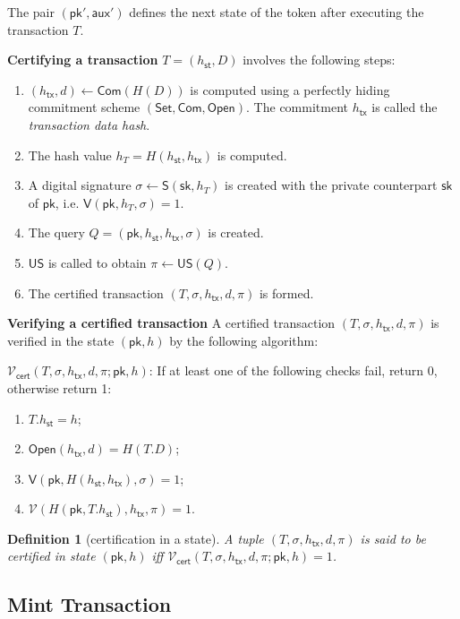 \documentclass{article}
\newtheorem{definition}{Definition}[section]
\newcommand{\sig}[0]{\mathsf{S}}
\newcommand{\sigver}[0]{\mathsf{V}}
\newcommand{\pubkey}[0]{\mathsf{pk}}
\newcommand{\prikey}[0]{\mathsf{sk}}
\newcommand{\setup}[0]{\mathsf{Set}}
\newcommand{\commit}[0]{\mathsf{Com}}
\newcommand{\open}[0]{\mathsf{Open}}
\newcommand{\unisrv}[0]{\mathsf{US}}
\newcommand{\sthash}[0]{h_\mathsf{st}}
\newcommand{\txhash}[0]{h_\mathsf{tx}}
\newcommand{\auxd}[0]{\mathsf{aux}}
\newcommand{\univer}[0]{\mathcal{V}}
\newcommand{\certver}[0]{\mathcal{V}_\mathsf{cert}}
\begin{document}
The pair $(\pubkey', \auxd')$ defines the next state of the token after executing the transaction $T$.

\noindent\textbf{Certifying a transaction} $T = (\sthash, D)$ involves the following steps:
\begin{enumerate}
\item $(\txhash,d) \gets \commit(H(D))$ is computed using a perfectly hiding commitment scheme $(\setup,\commit,\open)$.
The commitment $\txhash$ is called the \emph{transaction data hash}.
\item The hash value $h_T = H(\sthash, \txhash)$ is computed.
\item A digital signature $\sigma \gets \sig(\prikey, h_T)$ is created with the private counterpart $\prikey$ of $\pubkey$, i.e. $\mathsf{V}(\pubkey, h_T, \sigma) = 1$.
\item The query $Q = (\pubkey,\sthash,\txhash,\sigma)$ is created.
\item $\unisrv$ is called to obtain $\pi\gets \unisrv(Q)$.
\item The certified transaction $(T,\sigma,\txhash,d,\pi)$ is formed.
\end{enumerate}

\noindent\textbf{Verifying a certified transaction} A certified transaction $(T,\sigma,\txhash,d,\pi)$ is verified in the state $(\pubkey,h)$ by the following algorithm:\medskip

\noindent $\certver(T,\sigma,\txhash,d,\pi;\pubkey,h)$:
If at least one of the following checks fail, return 0, otherwise return 1:
\begin{enumerate}
\item $T.\sthash=h$;
\item $\open(\txhash,d)=H(T.D)$;
\item $\sigver(\pubkey, H(\sthash,\txhash),\sigma)=1$;
\item $\univer(H(\pubkey,T.\sthash),\txhash,\pi)=1$.
\end{enumerate}

\begin{definition}[certification in a state]\label{de:certstate}
A tuple $(T,\sigma,\txhash,d,\pi)$ is said to be \emph{certified in state} $(\pubkey,h)$ iff $\certver(T,\sigma,\txhash,d,\pi;\pubkey,h)=1$.
\end{definition}


\subsection{Mint Transaction}
\end{document}
